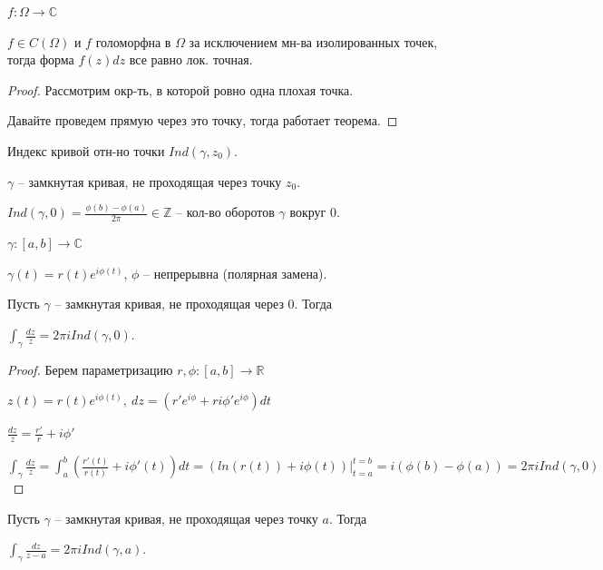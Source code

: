 \begin{consequence}
    $f: \Omega \rightarrow \mathbb{C}$

    $f \in C(\Omega)$ и $f$ голоморфна в $\Omega$ за исключением мн-ва изолированных точек, тогда форма $f(z) dz$ все равно лок. точная.
\end{consequence}
\begin{proof}
    Рассмотрим окр-ть, в которой ровно одна плохая точка.

    Давайте проведем прямую через это точку, тогда работает теорема.
\end{proof}

\begin{definition}
    Индекс кривой отн-но точки $Ind(\gamma, z_0)$.

    $\gamma$ -- замкнутая кривая, не проходящая через точку $z_0$.

    $Ind(\gamma, 0) = \frac{\phi(b) - \phi(a)}{2\pi} \in \mathbb{Z}$ -- кол-во оборотов $\gamma$ вокруг 0.

    $\gamma: [a, b] \rightarrow \mathbb{C}$

    $\gamma(t) = r(t) e^{i \phi(t)}$, $\phi$ -- непрерывна (полярная замена).
\end{definition}

\begin{theorem}
    Пусть $\gamma$ -- замкнутая кривая, не проходящая через 0. Тогда
    
    $\int_{\gamma} { \frac{d z}{z} } = 2\pi i Ind(\gamma, 0)$.
\end{theorem}
\begin{proof}
    Берем параметризацию $r, \phi: [a, b] \rightarrow \mathbb{R}$

    $z(t) = r(t) e^{i \phi(t)}, \ dz = \left( r' e^{i\phi} + ri \phi' e^{i\phi} \right) dt$

    $\frac{dz}{z} = \frac{r'}{r} + i \phi'$

    $\int_{\gamma} { \frac{dz}{z} } = \int_{a}^{b} { \left( \frac{r'(t)}{r(t)} + i \phi'(t) \right) dt } = \left( ln (r(t)) + i \phi(t) \right)|_{t = a}^{t = b} = i (\phi(b) - \phi(a)) = 2 \pi i Ind(\gamma, 0)$
\end{proof}

\begin{consequence}
    Пусть $\gamma$ -- замкнутая кривая, не проходящая через точку $a$. Тогда

    $\int_{\gamma} { \frac{dz}{z - a} = 2 \pi i Ind (\gamma, a) }$.
\end{consequence}

